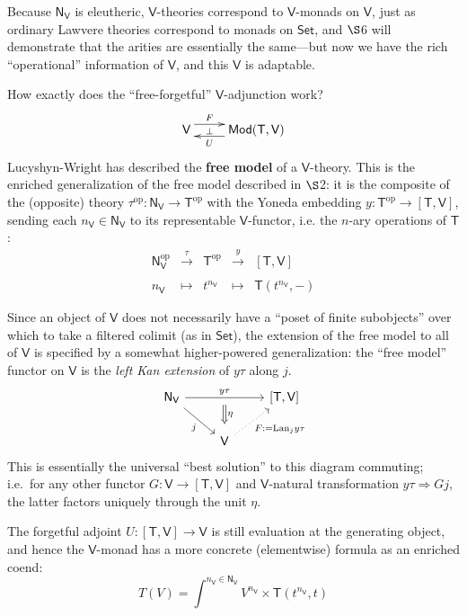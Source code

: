 \documentclass{amsart}
\theoremstyle{definition}
\newcommand{\Set}{\mathsf{Set}}
\newcommand{\Mod}{\mathsf{Mod}}
\newcommand{\NN}{\mathsf{N}}
\newcommand{\V}{\mathsf{V}}
\newcommand{\T}{\mathsf{T}}
\newcommand{\op}{\mathrm{op}}
\newcommand{\maps}{\colon}
\begin{document}
Because $\NN_\V$ is eleutheric, $\V$-theories correspond to $\V$-monads on $\V$, just as ordinary Lawvere theories correspond to monads on $\Set$, and $\S$6 will demonstrate that the arities are essentially the same---but now we have the rich ``operational'' information of $\V$, and this $\V$ is adaptable.

How exactly does the ``free-forgetful'' $\V$-adjunction work?
\[
\xymatrix{
\V \ar@<1.1ex>[r]^-F_-\bot &
\Mod(\T,\V) \ar@<1.1ex>[l]^-U
}\]
Lucyshyn-Wright \cite[Sec.\ 8]{rbb} has described the \textbf{free model} of a $\V$-theory.  This is the enriched generalization of the free model described in $\S$2: it is the composite of the (opposite) theory $\tau^\op\maps \NN_\V \to \T^\op$ with the Yoneda embedding $y\maps \T^\op \to [\T,\V]$, sending each $n_\V \in \NN_\V$ to its representable $\V$-functor, i.e. the $n$-ary operations of $\T$:
\[\begin{array}{rllll}
\NN_\V^\op & \xrightarrow{\tau} & \T^\op & \xrightarrow{y} & \left[\T,\V\right]\\
\\
n_\V & \mapsto & t^{n_\V} & \mapsto & \T(t^{n_\V},-)
\end{array}\]

Since an object of $\V$ does not necessarily have a ``poset of finite subobjects'' over which to take a filtered colimit (as in $\Set$), the extension of the free model to all of $\V$ is specified by a somewhat higher-powered generalization: the ``free model'' functor on $\V$ is the \textit{left Kan extension} of $y\tau$ along $j$.
\[\begin{tikzcd}
\NN_\V \arrow[rr,"y\tau"{name=y}] \arrow[swap,rd,"j"] & & \left[\T,\V\right]\\
& \V \arrow[swap,dotted, ru,"F:=\mathrm{Lan}_jy\tau"] \arrow[Rightarrow,from=y,"\eta", shorten >=0.2cm,shorten <=.2cm]
\end{tikzcd}\]
This is essentially the universal ``best solution'' to this diagram commuting; i.e.\ for any other functor $G \colon \V \to [\T,\V]$ and $\V$-natural transformation $y\tau \Rightarrow Gj$, the latter factors uniquely through the unit $\eta$.

The forgetful adjoint $U\maps [\T,\V] \to \V$ is still evaluation at the generating object, and hence the $\V$-monad has a more concrete (elementwise) formula as an enriched coend:
\begin{equation}
T(V) = \int^{n_\V\in \NN_\V} V^{n_\V} \times \T(t^{n_\V},t)
\end{equation}
\end{document}
